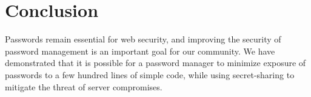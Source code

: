 \section{Conclusion}

Passwords remain essential for web security, and improving the security of password management is an important goal for our community. We have demonstrated that it is possible for a password manager to minimize exposure of passwords to a few hundred lines of simple code, while using secret-sharing to mitigate the threat of server compromises. 


